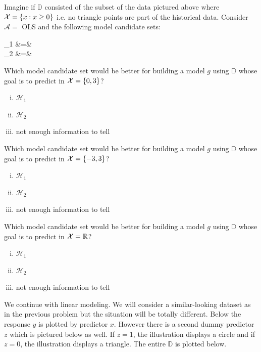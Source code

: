\documentclass[12pt]{article}
\begin{document}
\noindent Imagine if $\mathbb{D}$ consisted of the subset of the data pictured above where $\mathcal{X} = \left\{x : x \geq 0\right\}$ i.e. no triangle points are part of the historical data. Consider $\mathcal{A} = $ OLS and the following model candidate sets:

\beqn
{}_1 &=&  \\
_2 &=&  \\
\eeqn

\benum

 Which model candidate set would be better for building a model $g$ using $\mathbb{D}$ whose goal is to predict in $\mathcal{X} = \left\{0, 3\right\}$?

\begin{enumerate}[i)]
\item $\mathcal{H}_1$
\item $\mathcal{H}_2$
\item not enough information to tell
\end{enumerate}

 Which model candidate set would be better for building a model $g$ using $\mathbb{D}$ whose goal is to predict in $\mathcal{X} = \left\{-3, 3\right\}$?

\begin{enumerate}[i)]
\item $\mathcal{H}_1$
\item $\mathcal{H}_2$
\item not enough information to tell
\end{enumerate}
\pagebreak

 Which model candidate set would be better for building a model $g$ using $\mathbb{D}$ whose goal is to predict in $\mathcal{X} = \mathbb{R}$?

\begin{enumerate}[i)]
\item $\mathcal{H}_1$
\item $\mathcal{H}_2$
\item not enough information to tell
\end{enumerate}

\eenum


\problem We continue with  linear modeling. We will consider a similar-looking dataset as in the previous problem but the situation will be totally different. Below the response $y$ is plotted by predictor $x$. However there is a second dummy predictor $z$ which is pictured below as well. If $z=1$, the illustration displays a circle and if $z=0$, the illustration displays a triangle. The entire $\mathbb{D}$ is plotted below.
\end{document}
